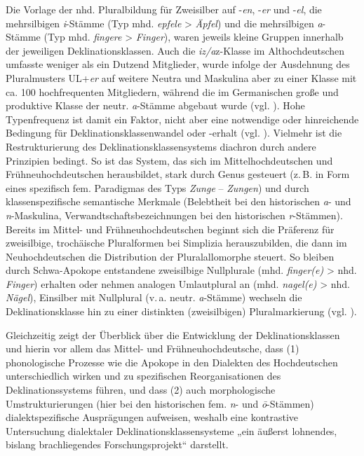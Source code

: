 Die Vorlage der nhd. Pluralbildung für Zweisilber auf -\textit{en}, -\textit{er} und -\textit{el}, die mehrsilbigen \textit{i}{}-Stämme (Typ mhd. \textit{epfele} > \textit{Äpfel}) und die mehrsilbigen \textit{a}{}-Stämme (Typ mhd. \textit{fingere} > \textit{Finger}), waren jeweils kleine Gruppen innerhalb der jeweiligen Deklinationsklassen. Auch die \textit{iz/a}z-Klasse im Althochdeutschen umfasste weniger als ein Dutzend Mitglieder, wurde infolge der Ausdehnung des Pluralmusters UL+\textit{er} auf weitere Neutra und Maskulina aber zu einer Klasse mit ca. 100 hochfrequenten Mitgliedern, während die im Germanischen große und produktive Klasse der neutr. \textit{a}{}-Stämme abgebaut wurde (vgl. \citealt[87]{Wegener2005}). Hohe Typenfrequenz ist damit ein Faktor, nicht aber eine notwendige oder hinreichende Bedingung für Deklinationsklassenwandel oder -erhalt (vgl. \citealt[293]{Nübling2008}). Vielmehr ist die Restrukturierung des Deklinationsklassensystems diachron durch andere Prinzipien bedingt. So ist das System, das sich im Mittelhochdeutschen und Frühneuhochdeutschen herausbildet, stark durch Genus gesteuert (z.\,B. in Form eines spezifisch fem. Paradigmas des Typs \textit{Zunge} -- \textit{Zungen}) und durch klassenspezifische semantische Merkmale (Belebtheit bei den historischen \textit{a}{}- und \textit{n}{}-Maskulina, Verwandtschaftsbezeichnungen bei den historischen \textit{r}{}-Stämmen). Bereits im Mittel- und Frühneuhochdeutschen beginnt sich die Präferenz für zweisilbige, trochäische Pluralformen bei Simplizia herauszubilden, die dann im Neuhochdeutschen die Distribution der Pluralallomorphe steuert. So bleiben durch Schwa-Apokope entstandene zweisilbige Nullplurale (mhd. \textit{finger(e)} > nhd. \textit{Finger}) erhalten oder nehmen analogen Umlautplural an (mhd. \textit{nagel(e)} > nhd. \textit{Nägel}), Einsilber mit Nullplural (v.\,a. neutr. \textit{a}-Stämme) wechseln die Deklinationsklasse hin zu einer distinkten (zweisilbigen) Pluralmarkierung (vgl. \citealt[105--106 und 123]{Kürschner2008a}).

\begin{sloppypar}
Gleichzeitig zeigt der Überblick über die Entwicklung der Deklinationsklassen und hierin vor allem das Mittel- und Frühneuhochdeutsche, dass (1) phonologische Prozesse wie die Apokope in den Dialekten des Hochdeutschen unterschiedlich wirken und zu spezifischen Reorganisationen des Deklinationssystems führen, und dass (2) auch morphologische Umstrukturierungen (hier bei den historischen fem. \textit{n}{}- und \textit{ō}{}-Stämmen) dialektspezifische Ausprägungen aufweisen, weshalb eine kontrastive Untersuchung dialektaler Deklinationsklassensysteme „ein äußerst lohnendes, bislang brachliegendes Forschungsprojekt“ \citep[312]{Nübling2008} darstellt.
\end{sloppypar}

